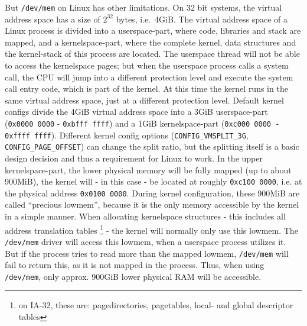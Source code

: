 But \texttt{/dev/mem} on Linux has other limitations\label{kerneluserdivision}.
On 32 bit systems, the virtual address space has a size of $2^{32}$ bytes,
i.e.~4GiB.  The virtual address space of a Linux process is divided into a
userspace-part, where code, libraries and stack are mapped, and a
kernelspace-part, where the complete kernel, data structures and the
kernel-stack of this process are located. The userspace thread will not be able
to access the kernelspace pages; but when the userspace process calls a system
call, the CPU will jump into a different protection level and execute the system
call entry code, which is part of the kernel. At this time the kernel runs in
the same virtual address space, just at a different protection level.  Default
kernel configs divide the 4GiB virtual address space into a 3GiB userspace-part
(\texttt{0x0000~0000} - \texttt{0xbfff~ffff}) and a 1GiB kernelspace-part
(\texttt{0xc000~0000 - 0xffff~ffff}).  Different kernel config options
(\texttt{CONFIG\_VMSPLIT\_3G}, \texttt{CONFIG\_PAGE\_OFFSET}) can change the
split ratio, but the splitting itself is a basic design decision and thus a
requirement for Linux to work. In the upper kernelspace-part, the lower physical
memory will be fully mapped (up to about 900MiB), the kernel will - in this case
- be located at roughly \texttt{0xc100~0000}, i.e. at the physical address
\texttt{0x0100~0000}. During kernel configuration, these 900MiB are called
``precious lowmem'', because it is the only memory accessible by the kernel in a
simple manner. When allocating kernelspace structures - this includes all
address translation tables \footnote{on IA-32, these are: pagedirectories,
pagetables, local- and global descriptor tables} \label{linuxATTinlowmem} - the
kernel will normally only use this lowmem.  The \texttt{/dev/mem} driver will
access this lowmem, when a userspace process utilizes it. But if the process
tries to read more than the mapped lowmem, \texttt{/dev/mem} will fail to return
this, as it is not mapped in the process.  Thus, when using \texttt{/dev/mem},
only approx.  900GiB lower physical RAM will be accessible.

